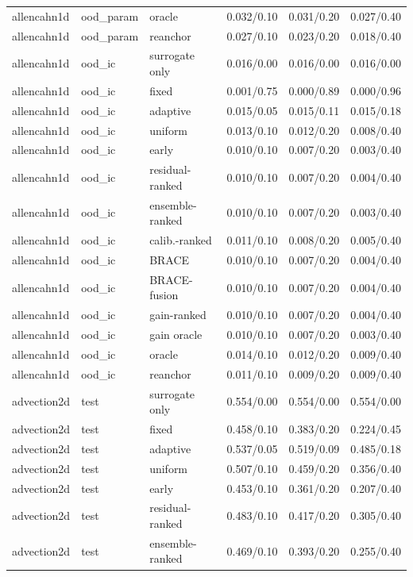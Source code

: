 \begin{tabular}{lllrrr}
allencahn1d & ood\_param & oracle & 0.032/0.10 & 0.031/0.20 & 0.027/0.40 \\
allencahn1d & ood\_param & reanchor & 0.027/0.10 & 0.023/0.20 & 0.018/0.40 \\
\midrule
allencahn1d & ood\_ic & surrogate only & 0.016/0.00 & 0.016/0.00 & 0.016/0.00 \\
allencahn1d & ood\_ic & fixed & 0.001/0.75 & 0.000/0.89 & 0.000/0.96 \\
allencahn1d & ood\_ic & adaptive & 0.015/0.05 & 0.015/0.11 & 0.015/0.18 \\
allencahn1d & ood\_ic & uniform & 0.013/0.10 & 0.012/0.20 & 0.008/0.40 \\
allencahn1d & ood\_ic & early & 0.010/0.10 & 0.007/0.20 & 0.003/0.40 \\
allencahn1d & ood\_ic & residual-ranked & 0.010/0.10 & 0.007/0.20 & 0.004/0.40 \\
allencahn1d & ood\_ic & ensemble-ranked & 0.010/0.10 & 0.007/0.20 & 0.003/0.40 \\
allencahn1d & ood\_ic & calib.-ranked & 0.011/0.10 & 0.008/0.20 & 0.005/0.40 \\
allencahn1d & ood\_ic & BRACE & 0.010/0.10 & 0.007/0.20 & 0.004/0.40 \\
allencahn1d & ood\_ic & BRACE-fusion & 0.010/0.10 & 0.007/0.20 & 0.004/0.40 \\
allencahn1d & ood\_ic & gain-ranked & 0.010/0.10 & 0.007/0.20 & 0.004/0.40 \\
allencahn1d & ood\_ic & gain oracle & 0.010/0.10 & 0.007/0.20 & 0.003/0.40 \\
allencahn1d & ood\_ic & oracle & 0.014/0.10 & 0.012/0.20 & 0.009/0.40 \\
allencahn1d & ood\_ic & reanchor & 0.011/0.10 & 0.009/0.20 & 0.009/0.40 \\
\midrule
advection2d & test & surrogate only & 0.554/0.00 & 0.554/0.00 & 0.554/0.00 \\
advection2d & test & fixed & 0.458/0.10 & 0.383/0.20 & 0.224/0.45 \\
advection2d & test & adaptive & 0.537/0.05 & 0.519/0.09 & 0.485/0.18 \\
advection2d & test & uniform & 0.507/0.10 & 0.459/0.20 & 0.356/0.40 \\
advection2d & test & early & 0.453/0.10 & 0.361/0.20 & 0.207/0.40 \\
advection2d & test & residual-ranked & 0.483/0.10 & 0.417/0.20 & 0.305/0.40 \\
advection2d & test & ensemble-ranked & 0.469/0.10 & 0.393/0.20 & 0.255/0.40 \\

\end{tabular}
